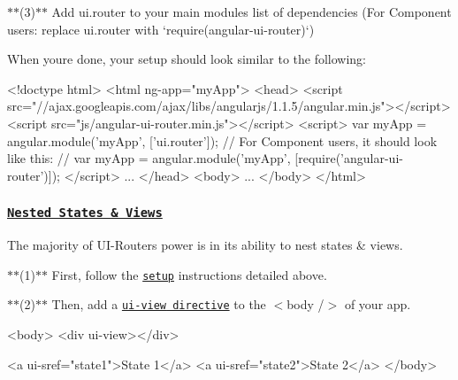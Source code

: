 $\ast$$\ast$(3)$\ast$$\ast$ Add {\ttfamily \textquotesingle{}ui.\+router\textquotesingle{}} to your main module\textquotesingle{}s list of dependencies (For Component users\+: replace {\ttfamily \textquotesingle{}ui.\+router\textquotesingle{}} with `require(\textquotesingle{}angular-\/ui-\/router\textquotesingle{})`)

When you\textquotesingle{}re done, your setup should look similar to the following\+:

\begin{quote}


\end{quote}

\begin{DoxyCode}
<!doctype html>
<html ng-app="myApp">
<head>
    <script src="//ajax.googleapis.com/ajax/libs/angularjs/1.1.5/angular.min.js"></script>
    <script src="js/angular-ui-router.min.js"></script>
    <script>
        var myApp = angular.module('myApp', ['ui.router']);
        // For Component users, it should look like this:
        // var myApp = angular.module('myApp', [require('angular-ui-router')]);
    </script>
    ...
</head>
<body>
    ...
</body>
</html>
\end{DoxyCode}


\subsubsection*{\href{http://plnkr.co/edit/u18KQc?p=preview}{\tt Nested States \& Views}}

The majority of U\+I-\/\+Router\textquotesingle{}s power is in its ability to nest states \& views.

$\ast$$\ast$(1)$\ast$$\ast$ First, follow the \href{#get-started}{\tt setup} instructions detailed above.

$\ast$$\ast$(2)$\ast$$\ast$ Then, add a \href{https://github.com/angular-ui/ui-router/wiki/Quick-Reference#ui-view}{\tt {\ttfamily ui-\/view} directive} to the {\ttfamily $<$body /$>$} of your app.

\begin{quote}


\end{quote}

\begin{DoxyCode}
<body>
    <div ui-view></div>
    
    <a ui-sref="state1">State 1</a>
    <a ui-sref="state2">State 2</a>
</body>
\end{DoxyCode}


